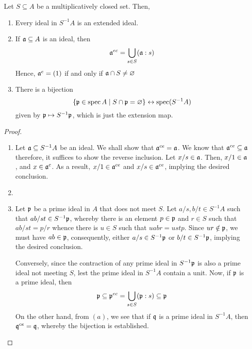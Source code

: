 \begin{theorem}
    Let $S\subseteq A$ be a multiplicatively closed set. Then, 
    \begin{enumerate}[label=(\alph*)]
        \item Every ideal in $S^{-1}A$ is an extended ideal. 
        \item If $\mathfrak a\subseteq A$ is an ideal, then 
        \begin{equation*}
            \mathfrak a^{ec} = \bigcup_{s\in S}(\mathfrak a: s)
        \end{equation*}
        Hence, $\mathfrak a^e = (1)$ if and only if $\mathfrak a\cap S\ne\varnothing$ 
        \item There is a bijection 
        \begin{equation*}
            \{\mathfrak p\in\operatorname{spec} A\mid S\cap\mathfrak p = \varnothing\}\leftrightarrow\operatorname{spec}(S^{-1}A)
        \end{equation*}
        given by $\mathfrak p\mapsto S^{-1}\mathfrak p$, which is just the extension map.
    \end{enumerate}
\end{theorem}
\begin{proof}
\begin{enumerate}[label=(\alph*)]
    \item Let $\mathfrak a\subseteq S^{-1}A$ be an ideal. We shall show that $\mathfrak a^{ce} = \mathfrak a$. We know that $\mathfrak a^{ce}\subseteq\mathfrak a$ therefore, it suffices to show the reverse inclusion. Let $x/s\in\mathfrak a$. Then, $x/1\in\mathfrak a$, and $x\in\mathfrak a^c$. As a result, $x/1\in\mathfrak a^{ce}$ and $x/s\in\mathfrak a^{ce}$, implying the desired conclusion.
    \item 
    \item Let $\mathfrak p$ be a prime ideal in $A$ that does not meet $S$. Let $a/s,b/t\in S^{-1}A$ such that $ab/st\in S^{-1}\mathfrak p$, whereby there is an element $p\in\mathfrak p$ and $r\in S$ such that $ab/st = p/r$ whence there is $u\in S$ such that $uabr = ustp$. Since $ur\notin\mathfrak p$, we must have $ab\in\mathfrak p$, consequently, either $a/s\in S^{-1}\mathfrak p$ or $b/t\in S^{-1}\mathfrak p$, implying the desired conclusion.

    Conversely, since the contraction of any prime ideal in $S^{-1}\mathfrak p$ is also a prime ideal not meeting $S$, lest the prime ideal in $S^{-1} A$ contain a unit. Now, if $\mathfrak p$ is a prime ideal, then 
    \begin{equation*}
        \mathfrak p\subseteq\mathfrak p^{ec} = \bigcup_{s\in S}(\mathfrak p: s)\subseteq\mathfrak p
    \end{equation*}
    On the other hand, from $(a)$, we see that if $\mathfrak q$ is a prime ideal in $S^{-1}A$, then $\mathfrak q^{ce} = \mathfrak q$, whereby the bijection is established.
\end{enumerate}
\end{proof}

